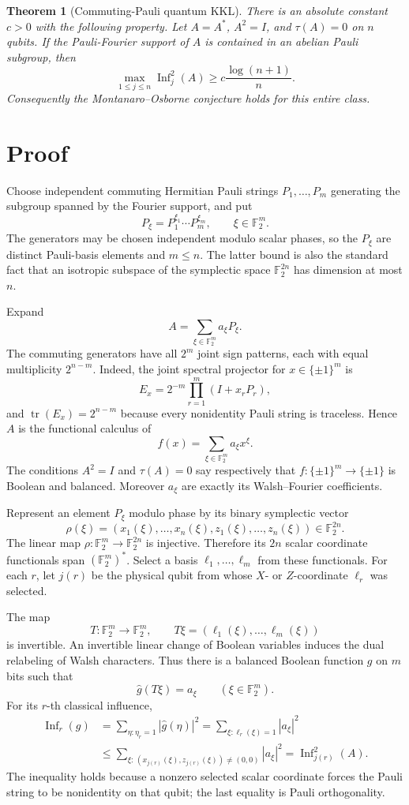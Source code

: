 \documentclass[11pt]{article}
\newtheorem{theorem}{Theorem}
\newcommand{\F}{\mathbb F}
\newcommand{\Inf}{\operatorname{Inf}}
\newcommand{\tr}{\operatorname{tr}}
\begin{document}
\begin{theorem}[Commuting-Pauli quantum KKL]\label{thm:main}
There is an absolute constant $c>0$ with the following property.  Let
$A=A^*$, $A^2=I$, and $\tau(A)=0$ on $n$ qubits.  If the Pauli-Fourier support
of $A$ is contained in an abelian Pauli subgroup, then
\[
  \max_{1\leq j\leq n}\Inf_j^2(A)
  \geq c\frac{\log(n+1)}{n}.
\]
Consequently the Montanaro--Osborne conjecture holds for this entire class.
\end{theorem}

\section{Proof}

Choose independent commuting Hermitian Pauli strings
$P_1,\ldots,P_m$ generating the subgroup spanned by the Fourier support, and
put
\[
 P_\xi=P_1^{\xi_1}\cdots P_m^{\xi_m},\qquad \xi\in\F_2^m.
\]
The generators may be chosen independent modulo scalar phases, so the
$P_\xi$ are distinct Pauli-basis elements and $m\leq n$.  The latter bound is
also the standard fact that an isotropic subspace of the symplectic space
$\F_2^{2n}$ has dimension at most $n$.

Expand
\[
 A=\sum_{\xi\in\F_2^m}a_\xi P_\xi.
\]
The commuting generators have all $2^m$ joint sign patterns, each with equal
multiplicity $2^{n-m}$.  Indeed, the joint spectral projector for
$x\in\{\pm1\}^m$ is
\[
 E_x=2^{-m}\prod_{r=1}^m(I+x_rP_r),
\]
and $\tr(E_x)=2^{n-m}$ because every nonidentity Pauli string is traceless.
Hence $A$ is the functional calculus of
\[
 f(x)=\sum_{\xi\in\F_2^m}a_\xi x^\xi.
\]
The conditions $A^2=I$ and $\tau(A)=0$ say respectively that
$f:\{\pm1\}^m\to\{\pm1\}$ is Boolean and balanced.  Moreover $a_\xi$ are
exactly its Walsh--Fourier coefficients.

Represent an element $P_\xi$ modulo phase by its binary symplectic vector
\[
 \rho(\xi)=(x_1(\xi),\ldots,x_n(\xi),z_1(\xi),\ldots,z_n(\xi))
 \in\F_2^{2n}.
\]
The linear map $\rho:\F_2^m\to\F_2^{2n}$ is injective.  Therefore its
$2n$ scalar coordinate functionals span $(\F_2^m)^*$.  Select a basis
$\ell_1,\ldots,\ell_m$ from these functionals.  For each $r$, let $j(r)$ be
the physical qubit from whose $X$- or $Z$-coordinate $\ell_r$ was selected.

The map
\[
 T:\F_2^m\longrightarrow\F_2^m,
 \qquad T\xi=(\ell_1(\xi),\ldots,\ell_m(\xi))
\]
is invertible.  An invertible linear change of Boolean variables induces the
dual relabeling of Walsh characters.  Thus there is a balanced Boolean
function $g$ on $m$ bits such that
\[
 \widehat g(T\xi)=a_\xi\qquad(\xi\in\F_2^m).
\]
For its $r$-th classical influence,
\begin{align*}
 \Inf_r(g)
 &=\sum_{\eta:\eta_r=1}|\widehat g(\eta)|^2
   =\sum_{\xi:\ell_r(\xi)=1}|a_\xi|^2\\
 &\leq \sum_{\xi:\,(x_{j(r)}(\xi),z_{j(r)}(\xi))\ne(0,0)}|a_\xi|^2
   =\Inf_{j(r)}^2(A).
\end{align*}
The inequality holds because a nonzero selected scalar coordinate forces the
Pauli string to be nonidentity on that qubit; the last equality is Pauli
orthogonality.
\end{document}
